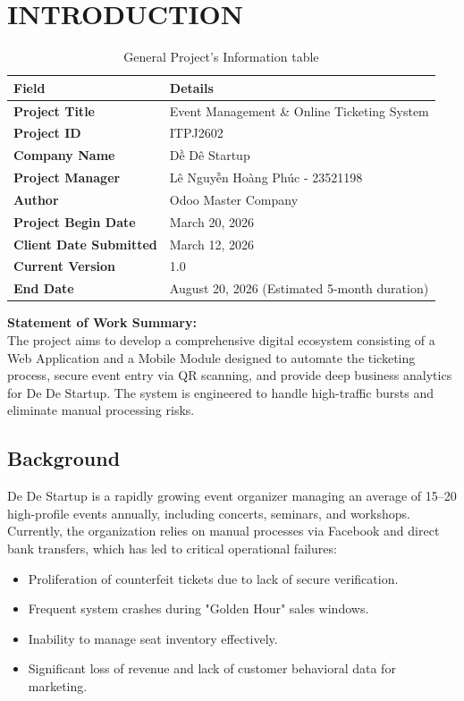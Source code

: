 \chapter{INTRODUCTION}
\begin{table}[H]
\centering
\renewcommand{\arraystretch}{1.5}
\begin{tabular}{|l|l|}
\hline
\rowcolor[HTML]{EFEFEF} 
\textbf{Field} & \textbf{Details} \\ \hline
\textbf{Project Title} & Event Management \& Online Ticketing System \\ \hline
\textbf{Project ID} & ITPJ2602 \\ \hline
\textbf{Company Name} & Dề Dê Startup \\ \hline
\textbf{Project Manager} & Lê Nguyễn Hoàng Phúc - 23521198 \\ \hline
\textbf{Author} & Odoo Master Company \\ \hline
\textbf{Project Begin Date} & March 20, 2026 \\ \hline
\textbf{Client Date Submitted} & March 12, 2026 \\ \hline
\textbf{Current Version} & 1.0 \\ \hline
\textbf{End Date} & August 20, 2026 (Estimated 5-month duration) \\ \hline
\end{tabular}
\caption{General Project's Information table}
\end{table}

\textbf{Statement of Work Summary:} \\
The project aims to develop a comprehensive digital ecosystem consisting of a Web Application and a Mobile Module designed to automate the ticketing process, secure event entry via QR scanning, and provide deep business analytics for De De Startup. The system is engineered to handle high-traffic bursts and eliminate manual processing risks.

\section{Background}
De De Startup is a rapidly growing event organizer managing an average of 15–20 high-profile events annually, including concerts, seminars, and workshops. Currently, the organization relies on manual processes via Facebook and direct bank transfers, which has led to critical operational failures:
\begin{itemize}
    \item Proliferation of counterfeit tickets due to lack of secure verification.
    \item Frequent system crashes during "Golden Hour" sales windows.
    \item Inability to manage seat inventory effectively.
    \item Significant loss of revenue and lack of customer behavioral data for marketing.
\end{itemize}

